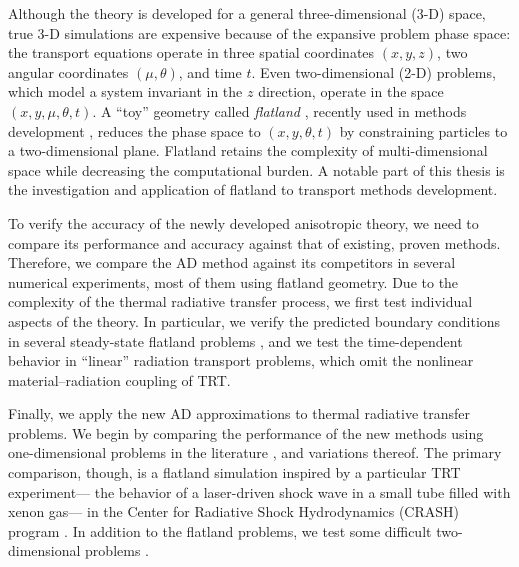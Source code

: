 Although the theory is developed for a general three-dimensional (3-D) space,
true 3-D simulations are expensive because of the expansive problem phase
space: the transport equations operate in three spatial coordinates $(x,y,z)$,
two angular coordinates $(\mu,\theta)$, and time $t$. Even two-dimensional (2-D)
problems, which model a system invariant in the $z$ direction, operate in the
space $(x,y,\mu,\theta,t)$. A ``toy'' geometry called \emph{flatland}
\cite{Abb1884}, recently used in methods development \cite{Asa2008,Lar2009c},
reduces the phase space to $(x,y,\theta,t)$ by constraining particles to a
two-dimensional plane. Flatland retains the complexity of multi-dimensional
space while decreasing the computational burden. A notable part of this thesis
is the investigation and application of flatland to transport methods
development.

To verify the accuracy of the newly developed anisotropic theory, we need to
compare its performance and accuracy against that of existing, proven methods.
Therefore, we compare the AD method against its competitors in several numerical
experiments, most of them using flatland geometry. Due to the complexity of
the thermal radiative transfer process, we first test individual aspects of the
theory. In particular, we verify the predicted boundary conditions in several
steady-state flatland problems \cite{Joh2011a}, and we test the time-dependent
behavior in ``linear'' radiation transport problems, which omit the nonlinear
material--radiation coupling of TRT.

Finally, we apply the new AD approximations to thermal radiative transfer
problems. We begin by comparing the performance of the new methods using
one-dimensional problems in the literature \cite{Rau2005}, and variations
thereof. The primary comparison, though, is a flatland simulation
\cite{Joh2011} inspired by a particular TRT experiment---%
the behavior of a laser-driven shock wave in a small tube filled with xenon
gas---%
in the Center for Radiative Shock Hydrodynamics (CRASH) program
\cite{Crash2010}. In addition to the flatland problems, we test some difficult
two-dimensional problems \cite{Mou2006}.


